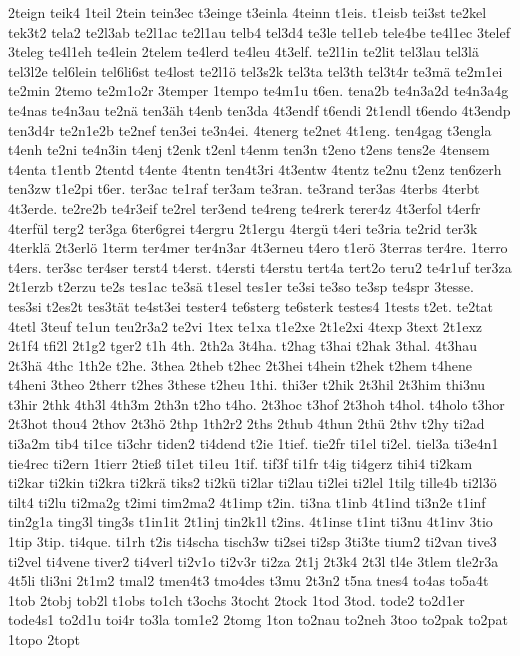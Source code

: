{2teign
teik4
1teil
2tein
tein3ec
t3einge
t3einla
4teinn
t1eis.
t1eisb
tei3st
te2kel
tek3t2
tela2
te2l3ab
te2l1ac
te2l1au
telb4
tel3d4
te3le
tel1eb
tele4be
te4l1ec
3telef
3teleg
te4l1eh
te4lein
2telem
te4lerd
te4leu
4t3elf.
te2l1in
te2lit
tel3lau
tel3lä
tel3l2e
tel6lein
tel6li6st
te4lost
te2l1ö
tel3s2k
tel3ta
tel3th
tel3t4r
te3mä
te2m1ei
te2min
2temo
te2m1o2r
3temper
1tempo
te4m1u
t6en.
tena2b
te4n3a2d
te4n3a4g
te4nas
te4n3au
te2nä
ten3äh
t4enb
ten3da
4t3endf
t6endi
2t1endl
t6endo
4t3endp
ten3d4r
te2n1e2b
te2nef
ten3ei
te3n4ei.
4tenerg
te2net
4t1eng.
ten4gag
t3engla
t4enh
te2ni
te4n3in
t4enj
t2enk
t2enl
t4enm
ten3n
t2eno
t2ens
tens2e
4tensem
t4enta
t1entb
2tentd
t4ente
4tentn
ten4t3ri
4t3entw
4tentz
te2nu
t2enz
ten6zerh
ten3zw
t1e2pi
t6er.
ter3ac
te1raf
ter3am
te3ran.
te3rand
ter3as
4terbs
4terbt
4t3erde.
te2re2b
te4r3eif
te2rel
ter3end
te4reng
te4rerk
terer4z
4t3erfol
t4erfr
4terfül
terg2
ter3ga
6ter6grei
t4ergru
2t1ergu
4tergü
t4eri
te3ria
te2rid
ter3k
4terklä
2t3erlö
1term
ter4mer
ter4n3ar
4t3erneu
t4ero
t1erö
3terras
ter4re.
1terro
t4ers.
ter3sc
ter4ser
terst4
t4erst.
t4ersti
t4erstu
tert4a
tert2o
teru2
te4r1uf
ter3za
2t1erzb
t2erzu
te2s
tes1ac
te3sä
t1esel
tes1er
te3si
te3so
te3sp
te4spr
3tesse.
tes3si
t2es2t
tes3tät
te4st3ei
tester4
te6sterg
te6sterk
testes4
1tests
t2et.
te2tat
4tetl
3teuf
te1un
teu2r3a2
te2vi
1tex
te1xa
t1e2xe
2t1e2xi
4texp
3text
2t1exz
2t1f4
tfi2l
2t1g2
tger2
t1h
4th.
2th2a
3t4ha.
t2hag
t3hai
t2hak
3thal.
4t3hau
2t3hä
4thc
1th2e
t2he.
3thea
2theb
t2hec
2t3hei
t4hein
t2hek
t2hem
t4hene
t4heni
3theo
2therr
t2hes
3these
t2heu
1thi.
thi3er
t2hik
2t3hil
2t3him
thi3nu
t3hir
2thk
4th3l
4th3m
2th3n
t2ho
t4ho.
2t3hoc
t3hof
2t3hoh
t4hol.
t4holo
t3hor
2t3hot
thou4
2thov
2t3hö
2thp
1th2r2
2ths
2thub
4thun
2thü
2thv
t2hy
ti2ad
ti3a2m
tib4
ti1ce
ti3chr
tiden2
ti4dend
t2ie
1tief.
tie2fr
ti1el
ti2el.
tiel3a
ti3e4n1
tie4rec
ti2ern
1tierr
2tieß
ti1et
ti1eu
1tif.
tif3f
ti1fr
t4ig
ti4gerz
tihi4
ti2kam
ti2kar
ti2kin
ti2kra
ti2krä
tiks2
ti2kü
ti2lar
ti2lau
ti2lei
ti2lel
1tilg
tille4b
ti2l3ö
tilt4
ti2lu
ti2ma2g
t2imi
tim2ma2
4t1imp
t2in.
ti3na
t1inb
4t1ind
ti3n2e
t1inf
tin2g1a
ting3l
ting3s
t1in1it
2t1inj
tin2k1l
t2ins.
4t1inse
t1int
ti3nu
4t1inv
3tio
1tip
3tip.
ti4que.
ti1rh
t2is
ti4scha
tisch3w
ti2sei
ti2sp
3ti3te
tium2
ti2van
tive3
ti2vel
ti4vene
tiver2
ti4verl
ti2v1o
ti2v3r
ti2za
2t1j
2t3k4
2t3l
tl4e
3tlem
tle2r3a
4t5li
tli3ni
2t1m2
tmal2
tmen4t3
tmo4des
t3mu
2t3n2
t5na
tnes4
to4as
to5a4t
1tob
2tobj
tob2l
t1obs
to1ch
t3ochs
3tocht
2tock
1tod
3tod.
tode2
to2d1er
tode4s1
to2d1u
toi4r
to3la
tom1e2
2tomg
1ton
to2nau
to2neh
3too
to2pak
to2pat
1topo
2topt
}
